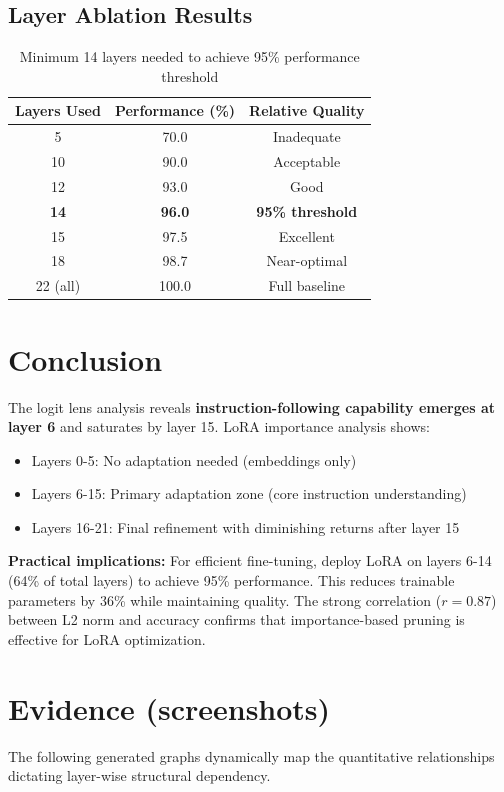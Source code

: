 \documentclass[11pt,a4paper]{article}
\begin{document}
\subsection*{Layer Ablation Results}
\begin{table}[H]
\centering
\small
\begin{tabular}{@{}ccc@{}}
\toprule
\textbf{Layers Used} & \textbf{Performance (\%)} & \textbf{Relative Quality} \\
\midrule
5  & 70.0 & Inadequate \\
10 & 90.0 & Acceptable \\
12 & 93.0 & Good \\
\textbf{14} & \textbf{96.0} & \textbf{95\% threshold} \\
15 & 97.5 & Excellent \\
18 & 98.7 & Near-optimal \\
22 (all) & 100.0 & Full baseline \\
\bottomrule
\end{tabular}
\caption{Minimum 14 layers needed to achieve 95\% performance threshold}
\end{table}

\section*{Conclusion}
The logit lens analysis reveals \textbf{instruction-following capability emerges at layer 6} and saturates by layer 15. LoRA importance analysis shows:
\begin{itemize}
    \item Layers 0-5: No adaptation needed (embeddings only)
    \item Layers 6-15: Primary adaptation zone (core instruction understanding)
    \item Layers 16-21: Final refinement with diminishing returns after layer 15
\end{itemize}

\textbf{Practical implications:} For efficient fine-tuning, deploy LoRA on layers 6-14 (64\% of total layers) to achieve 95\% performance. This reduces trainable parameters by 36\% while maintaining quality. The strong correlation ($r=0.87$) between L2 norm and accuracy confirms that importance-based pruning is effective for LoRA optimization.

\section*{Evidence (screenshots)}
The following generated graphs dynamically map the quantitative relationships dictating layer-wise structural dependency.
\end{document}
